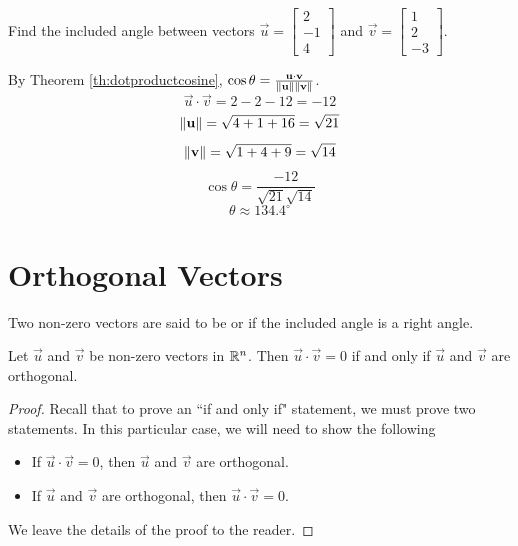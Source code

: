 \documentclass{ximera}
\begin{document}
\begin{example}\label{ex:anglebetweenvectors}
Find the included angle between vectors $\vec{u}=\begin{bmatrix}2\\-1\\4\end{bmatrix}$ and $\vec{v}=\begin{bmatrix}1\\2\\-3\end{bmatrix}$.

\begin{explanation}
By Theorem \ref{th:dotproductcosine}, $\cos \theta=\frac{\mathbf{u}\cdot \mathbf{v}}{\left\lVert\mathbf{u}\right\rVert\left\lVert\mathbf{v}\right\rVert}$.  
$$\vec{u}\cdot\vec{v}=2-2-12=-12$$
$$\left\lVert\mathbf{u}\right\rVert=\sqrt{4+1+16}=\sqrt{21}$$
$$\left\lVert\mathbf{v}\right\rVert=\sqrt{1+4+9}=\sqrt{14}$$
$$\cos\theta =\frac{-12}{\sqrt{21}\sqrt{14}}$$
$$\theta \approx 134.4^{\circ}  $$
\end{explanation}
\end{example}

\section*{Orthogonal Vectors}

Two non-zero vectors are said to be  or  if the included angle is a right angle.


  \begin{theorem}\label{th:orth} Let $\vec{u}$ and $\vec{v}$ be non-zero vectors in $\mathbb{R}^n$. Then $\vec{u}\cdot \vec{v}=0$ if and only if $\vec{u}$ and $\vec{v}$ are orthogonal.
\end{theorem}


\begin{proof} Recall that to prove an ``if and only if" statement, we must prove two statements.  In this particular case, we will need to show the following
\begin{itemize}
\item If $\vec{u}\cdot \vec{v}=0$, then $\vec{u}$ and $\vec{v}$ are orthogonal.
\item If $\vec{u}$ and $\vec{v}$ are orthogonal, then $\vec{u}\cdot \vec{v}=0$.
\end{itemize}
We leave the details of the proof to the reader.
\end{proof}
\end{document}
